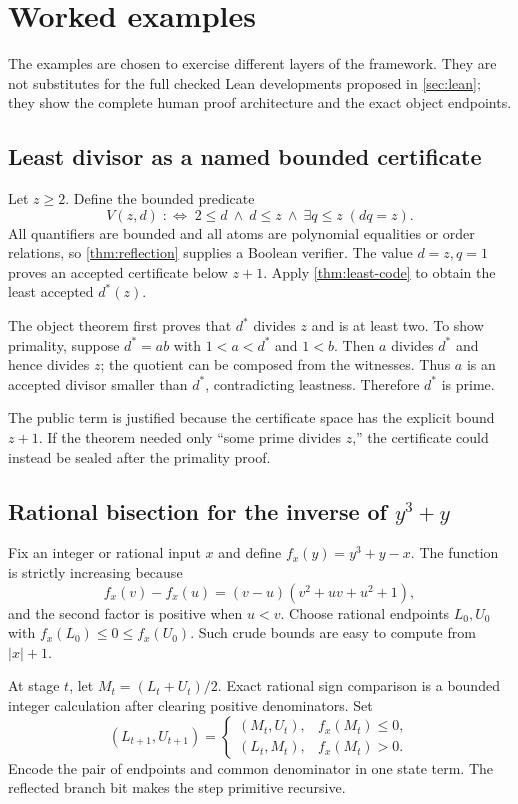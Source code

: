 \section{Worked examples}
\label{sec:examples}

The examples are chosen to exercise different layers of the framework.  They
are not substitutes for the full checked Lean developments proposed in
\cref{sec:lean}; they show the complete human proof architecture and the exact
object endpoints.

\subsection{Least divisor as a named bounded certificate}

Let \(z\ge2\).  Define the bounded predicate
\[
  V(z,d)\;:\!\Longleftrightarrow\;
  2\le d\ \wedge\ d\le z\ \wedge\ \exists q\le z\;(d q=z).
\]
All quantifiers are bounded and all atoms are polynomial equalities or order
relations, so \cref{thm:reflection} supplies a Boolean verifier.  The value
\(d=z,q=1\) proves an accepted certificate below \(z+1\).  Apply
\cref{thm:least-code} to obtain the least accepted \(d^*(z)\).

The object theorem first proves that \(d^*\) divides \(z\) and is at least two.
To show primality, suppose \(d^*=ab\) with \(1<a<d^*\) and \(1<b\).  Then
\(a\) divides \(d^*\) and hence divides \(z\); the quotient can be composed
from the witnesses.  Thus \(a\) is an accepted divisor smaller than \(d^*\),
contradicting leastness.  Therefore \(d^*\) is prime.

The public term is justified because the certificate space has the explicit
bound \(z+1\).  If the theorem needed only ``some prime divides \(z\),'' the
certificate could instead be sealed after the primality proof.

\subsection{Rational bisection for the inverse of \texorpdfstring{\(y^3+y\)}{y cubed plus y}}

Fix an integer or rational input \(x\) and define
\(f_x(y)=y^3+y-x\).  The function is strictly increasing because
\[
 f_x(v)-f_x(u)
  =(v-u)(v^2+uv+u^2+1),
\]
and the second factor is positive when \(u<v\).  Choose rational endpoints
\(L_0,U_0\) with \(f_x(L_0)\le0\le f_x(U_0)\).  Such crude bounds are easy to
compute from \(|x|+1\).

At stage \(t\), let \(M_t=(L_t+U_t)/2\).  Exact rational sign comparison is a
bounded integer calculation after clearing positive denominators.  Set
\[
 (L_{t+1},U_{t+1})=
 \begin{cases}
   (M_t,U_t),& f_x(M_t)\le0,\\
   (L_t,M_t),& f_x(M_t)>0.
 \end{cases}
\]
Encode the pair of endpoints and common denominator in one state term.  The
reflected branch bit makes the step primitive recursive.

